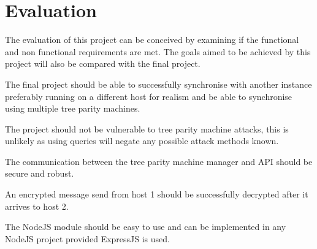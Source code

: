 \section{Evaluation}
The evaluation of this project can be conceived by examining if the functional and non functional requirements are met. The goals aimed to be achieved by this project will also be compared with the final project. 

The final project should be able to successfully synchronise with another instance preferably running on a different host for realism and be able to synchronise using multiple tree parity machines.

The project should not be vulnerable to tree parity machine attacks, this is unlikely as using queries will negate any possible attack methods known.

The communication between the tree parity machine manager and API should be secure and robust. 

An encrypted message send from host 1 should be successfully decrypted after it arrives to host 2.

The NodeJS module should be easy to use and can be implemented in any NodeJS project provided ExpressJS is used.

